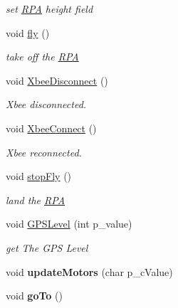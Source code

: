 \begin{DoxyCompactItemize}
\begin{DoxyCompactList}\small\item\em set \hyperlink{class_r_p_a}{R\-P\-A} height field \end{DoxyCompactList}\item 
void \hyperlink{class_m_a_r_c_s_a20f7f075177e920484493a84c29f5f55}{fly} ()
\begin{DoxyCompactList}\small\item\em take off the \hyperlink{class_r_p_a}{R\-P\-A} \end{DoxyCompactList}\item 
void \hyperlink{class_m_a_r_c_s_af65b8e4501c8df7c13da8a74b9d660ab}{Xbee\-Disconnect} ()
\begin{DoxyCompactList}\small\item\em Xbee disconnected. \end{DoxyCompactList}\item 
void \hyperlink{class_m_a_r_c_s_ac8432c3395079e3571bf7aa9fbc719fd}{Xbee\-Connect} ()
\begin{DoxyCompactList}\small\item\em Xbee reconnected. \end{DoxyCompactList}\item 
void \hyperlink{class_m_a_r_c_s_a0538c266d7bf2c8e5a3053456d00adfb}{stop\-Fly} ()
\begin{DoxyCompactList}\small\item\em land the \hyperlink{class_r_p_a}{R\-P\-A} \end{DoxyCompactList}\item 
void \hyperlink{class_m_a_r_c_s_a2910663593eef216a655a458574a89d3}{G\-P\-S\-Level} (int p\-\_\-value)
\begin{DoxyCompactList}\small\item\em get The G\-P\-S Level \end{DoxyCompactList}\item 
\hypertarget{class_m_a_r_c_s_aff8f2607574d7818ab82186bf3808fd2}{void {\bfseries update\-Motors} (char p\-\_\-c\-Value)}\label{class_m_a_r_c_s_aff8f2607574d7818ab82186bf3808fd2}

\item 
\hypertarget{class_m_a_r_c_s_a829ddc76366c181d42ae63a73a5cc18f}{void {\bfseries go\-To} ()}\label{class_m_a_r_c_s_a829ddc76366c181d42ae63a73a5cc18f}


\end{DoxyCompactItemize}
